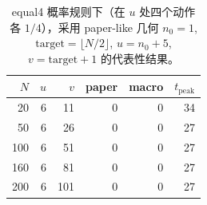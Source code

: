 \begin{table}[!htbp]
\centering
\small
\begin{tabular}{rrrrrr}
\toprule
$N$ & $u$ & $v$ & paper & macro & $t_\mathrm{peak}$\\
\midrule
20 & 6 & 11 & 0 & 0 & 34\\
50 & 6 & 26 & 0 & 0 & 27\\
100 & 6 & 51 & 0 & 0 & 27\\
160 & 6 & 81 & 0 & 0 & 27\\
200 & 6 & 101 & 0 & 0 & 27\\
\bottomrule
\end{tabular}
\caption{equal4 概率规则下（在 $u$ 处四个动作各 $1/4$），采用 paper-like 几何 $n_0=1$, $\mathrm{target}=\lfloor N/2\rfloor$, $u=n_0+5$, $v=\mathrm{target}+1$ 的代表性结果。}
\label{tab:equal4-paper-geom-cn}
\end{table}

